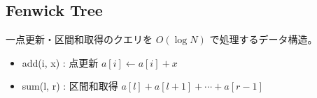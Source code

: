 \subsection{Fenwick Tree}
一点更新・区間和取得のクエリを $O(\log N)$ で処理するデータ構造。
\begin{itemize}
    \item add(i, x) : 点更新 $a[i] \xleftarrow{} a[i] +  x$
    \item sum(l, r) : 区間和取得 $a[l] + a[l + 1] + \cdots + a[r - 1]$
\end{itemize}


